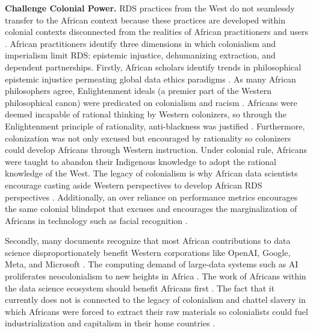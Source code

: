 \textbf{Challenge Colonial Power.}
\label{sec:chall_colo}
RDS practices from the West do not seamlessly transfer to the African context
because these practices are developed within colonial contexts disconnected from the realities of African practitioners and users \cite{eke2022forgotten, shilongo2023creativity,adelani2022masakhaner,gwagwa2019recommendations,eke2023introducing,okolo2023responsible, eke2023towards, goffi2023teaching,carman2023applying}. African practitioners identify three dimensions in which colonialism and imperialism limit RDS: epistemic injustice, dehumanizing extraction, and dependent partnerships. Firstly, African scholars identify trends in philosophical epistemic injustice permeating global data ethics paradigms \cite{eke2022forgotten, metz2021african, olojede2023towards}. As many African philosophers agree, Enlightenment ideals (a premier part of the Western philosophical canon) were predicated on colonialism and racism \cite{gwagwa2019recommendations}. Africans were deemed incapable of rational thinking by Western colonizers, so through the Enlightenment principle of rationality, anti-blackness was justified \cite{lauer2017african}. Furthermore, colonization was not only excused but encouraged by rationality so colonizers could develop Africans through Western instruction. Under colonial rule, Africans were taught to abandon their Indigenous knowledge to adopt the rational knowledge of the West. The legacy of colonialism is why African data scientists encourage casting aside Western perspectives to develop African RDS perspectives \cite{mhlambi2020from}. Additionally, an over reliance on performance metrics encourages the same colonial blindspot that excuses and encourages the marginalization of Africans in technology such as facial recognition \cite{mhlambi2020from, buolamwini2018gender, cisse2018look, gwagwa2022role}. 

Secondly, many documents recognize that most African contributions to data science disproportionately benefit Western corporations like OpenAI, Google, Meta, and Microsoft \cite{ndjungu2020blood,chan2021limits,abebe2021narratives, nwankwo2019africa, kiemde2022towards}. The computing demand of large-data systems such as AI proliferates neocolonialism to new heights in Africa \cite{eke2023towards}. The work of Africans within the data science ecosystem should benefit Africans first \cite{kohnert2022machine}. The fact that it currently does not is connected to the legacy of colonialism and chattel slavery in which Africans were forced to extract their raw materials so colonialists could fuel industrialization and capitalism in their home countries \cite{mhlambi2020from, ndjungu2020blood, day2023data, shilongo2023creativity, birhane2020algorithmic}.

